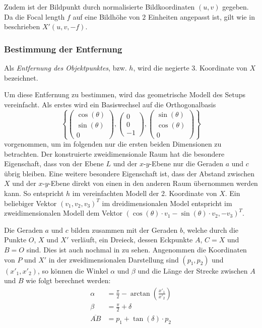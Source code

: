 \documentclass[ngerman,a4paper,parskip=half]{scrartcl}
\begin{document}
Zudem ist der Bildpunkt durch normalisierte Bildkoordinaten $(u, v)$ gegeben. Da die Focal length $f$ auf eine Bildhöhe von $2$ Einheiten angepasst ist, gilt wie in  beschrieben $X'(u, v, -f)$.

\subsubsection{Bestimmung der Entfernung}

Als \emph{Entfernung des Objektpunktes}, bzw. $h$, wird die negierte 3. Koordinate von $X$ bezeichnet.

Um diese Entfernung zu bestimmen, wird das geometrische Modell des Setups vereinfacht. Als erstes wird ein Basiswechsel auf die Orthogonalbasis
\[ \left\lbrace \begin{pmatrix}
\cos(\theta) \\ \sin(\theta) \\ 0
\end{pmatrix}, \begin{pmatrix}
0 \\ 0 \\ -1
\end{pmatrix}, \begin{pmatrix}
\sin(\theta) \\ \cos(\theta) \\ 0
\end{pmatrix} \right\rbrace \]
vorgenommen, um im folgenden nur die ersten beiden Dimensionen zu betrachten. Der konstruierte zweidimensionale Raum hat die besondere Eigenschaft, dass von der Ebene $L$ und der $x$-$y$-Ebene nur die Geraden $a$ und $c$ übrig bleiben. Eine weitere besondere Eigenschaft ist, dass der Abstand zwischen $X$ und der $x$-$y$-Ebene direkt von einen in den anderen Raum übernommen werden kann. So entspricht $h$ im vereinfachten Modell der 2. Koordinate von $X$. Ein beliebiger Vektor $(v_1, v_2, v_3)^T$ im dreidimensionalen Model entspricht im zweidimensionalen Modell dem Vektor $(\cos(\theta) \cdot v_1 - \sin(\theta) \cdot v_2, -v_3)^T$.

Die Geraden $a$ und $c$ bilden zusammen mit der Geraden $b$, welche durch die Punkte $O$, $X$ und $X'$ verläuft, ein Dreieck, dessen Eckpunkte $A$, $C = X$ und $B = O$ sind. Dies ist auch nochmal in  zu sehen. Angenommen die Koordinaten von $P$ und $X'$ in der zweidimensionalen Darstellung sind $(p_1,p_2)$ und $(x'_1, x'_2)$, so können die Winkel $\alpha$ und $\beta$ und die Länge der Strecke zwischen $A$ und $B$ wie folgt berechnet werden:
\begin{align*}
	\alpha &= \frac{\pi}{2} - \arctan\left(\frac{x'_1}{x'_2}\right)\\
	\beta &= \frac{\pi}{2} + \delta\\
	\overline{AB} &= p_1 + \tan(\delta) \cdot p_2
\end{align*}
\end{document}
